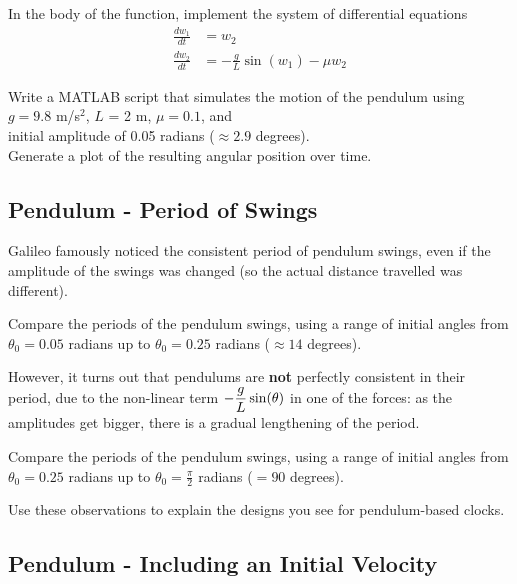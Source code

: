 In the body of the function, implement the system of differential
equations 
\begin{align*}
  \frac{d w_1}{dt} & = w_2 \\
  \frac{d w_2}{dt} & = -\frac{g}{L}\sin(w_1)  - \mu w_2
\end{align*}
\vsc

\newpage

\problem Write a MATLAB script that simulates the motion of the
pendulum
using  \\
$g = 9.8$ m/s$^2$, $L$ = 2 m, $\mu = 0.1$, and \\
initial amplitude of 0.05 radians ($\approx 2.9$ degrees). \\
Generate a plot of the resulting angular position over time.


\newpage 
{}
\subsection*{Pendulum - Period of Swings}

Galileo famously noticed the consistent period of pendulum swings,
even if the amplitude of the swings was changed (so the actual
distance travelled was different).

\vspace{2.5in}

\problem Compare the periods of the pendulum swings, using a range of
initial angles from $\theta_0 = 0.05$ radians up to $\theta_0 = 0.25$
radians ($\approx 14$ degrees).


\newpage
However, it turns out that pendulums are {\bf not} perfectly
consistent in their period, due to the non-linear term
$\displaystyle -\frac{g}{L} \sin(\theta)$ in one of the forces: as the
amplitudes get bigger, there is a gradual lengthening of the period.


\problem Compare the periods of the pendulum swings, using a range of
initial angles from $\theta_0 = 0.25$ radians up to $\theta_0 = \frac{\pi}{2}$
radians ($= 90$ degrees).

\newpage

\problem Use these observations to explain the designs you see for
pendulum-based clocks.

\newpage

\subsection*{Pendulum -  Including an Initial Velocity}

